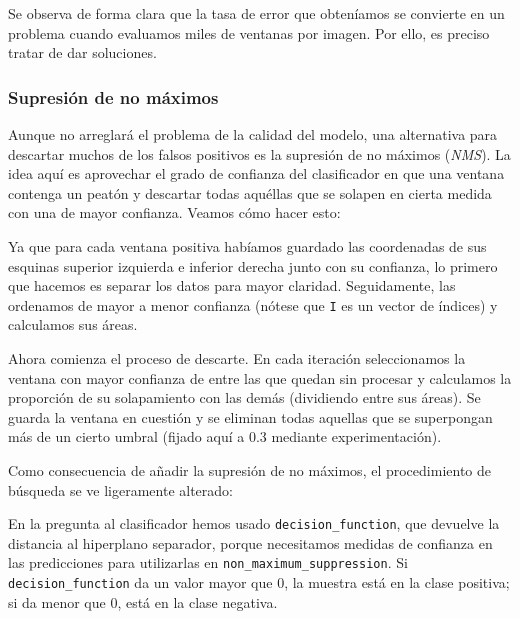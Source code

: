 \documentclass[11pt,a4paper]{article}
\begin{document}
            \par
            Se observa de forma clara que la tasa de error que obteníamos se convierte en un problema cuando evaluamos miles de ventanas por imagen. Por ello, es preciso tratar de dar soluciones.

            \subsubsection{Supresión de no máximos}

                \par
                Aunque no arreglará el problema de la calidad del modelo, una alternativa para descartar muchos de los falsos positivos es la supresión de no máximos (\textit{NMS}). La idea aquí es aprovechar el grado de confianza del clasificador en que una ventana contenga un peatón y descartar todas aquéllas que se solapen en cierta medida con una de mayor confianza. Veamos cómo hacer esto:


                \par
                Ya que para cada ventana positiva habíamos guardado las coordenadas de sus esquinas superior izquierda e inferior derecha junto con su confianza, lo primero que hacemos es separar los datos para mayor claridad. Seguidamente, las ordenamos de mayor a menor confianza (nótese que \texttt{I} es un vector de índices) y calculamos sus áreas.

                \par
                Ahora comienza el proceso de descarte. En cada iteración seleccionamos la ventana con mayor confianza de entre las que quedan sin procesar y calculamos la proporción de su solapamiento con las demás (dividiendo entre sus áreas). Se guarda la ventana en cuestión y se eliminan todas aquellas que se superpongan más de un cierto umbral (fijado aquí a 0.3 mediante experimentación).

                \par
                Como consecuencia de añadir la supresión de no máximos, el procedimiento de búsqueda se ve ligeramente alterado:


                \par
                En la pregunta al clasificador hemos usado \texttt{decision\_function}, que devuelve la distancia al hiperplano separador, porque necesitamos medidas de confianza en las predicciones para utilizarlas en \texttt{non\_maximum\_suppression}. Si \texttt{decision\_function} da un valor mayor que 0, la muestra está en la clase positiva; si da menor que 0, está en la clase negativa.
\end{document}
